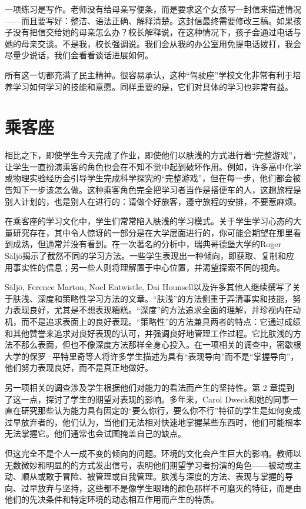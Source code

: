 一项练习是写作。老师没有给母亲写便条，而是要求这个女孩写一封信来描述情况——而且要写好：整洁、语法正确、解释清楚。这封信最终需要修改三稿。如果孩子没有把信交给她的母亲怎么办？校长解释说，在这种情况下，孩子会通过电话与她的母亲交谈。不是我，校长强调说。我们会从我的办公室用免提电话拨打，我会尽量少说话，我们会看看谈话进展如何。

所有这一切都充满了民主精神。很容易承认，这种“驾驶座”学校文化非常有利于培养学习如何学习的技能和意愿。同样重要的是，它们对具体的学习也非常有益。

\section*{乘客座}

相比之下，即使学生今天完成了作业，即使他们以肤浅的方式进行着“完整游戏”，让学生一直扮演乘客的角色也会在不知不觉中起到破坏作用。例如，许多高中化学或物理实验经历会引导学生完成科学探究的“完整游戏”，但在每一步，他们都会被告知下一步该怎么做。这种乘客角色完全把学习者当作是搭便车的人，这趟旅程是别人计划的，也是别人在进行的：请做个好旅客，遵守旅程的安排，不要惹麻烦。

在乘客座的学习文化中，学生们常常陷入肤浅的学习模式。关于学生学习心态的大量研究存在，其中令人惊讶的一部分是在大学层面进行的，你可能会期望在那里看到成熟，但通常并没有看到。在一次著名的分析中，瑞典哥德堡大学的Roger Säljö揭示了截然不同的学习方法。一些学生表现出一种倾向，即获取、复制和应用事实性的信息；另一些人则将理解置于中心位置，并渴望探索不同的视角。

Säljö, Ference Marton, Noel Entwistle, Dai Hounsell以及许多其他人继续撰写了关于肤浅、深度和策略性学习方法的文章。“肤浅”的方法侧重于弄清事实和技能，努力表现良好，尤其是不想表现糟糕。“深度”的方法追求全面的理解，并珍视内在动机，而不是追求表面上的良好表现。“策略性”的方法兼具两者的特点：它通过成绩和其他赞誉来追求对良好表现的认可，并强调良好地管理工作过程。它比肤浅的方法不那么表面，但也不像深度方法那样全身心投入。在一项相关的调查中，密歇根大学的保罗·平特里奇等人将许多学生描述为具有“表现导向”而不是“掌握导向”，他们努力表现良好，而不是真正地做好。

另一项相关的调查涉及学生根据他们对能力的看法而产生的坚持性。第 2 章提到了这一点，探讨了学生的期望对表现的影响。多年来，Carol Dweck和她的同事一直在研究那些认为能力具有固定的“要么你行，要么你不行”特征的学生是如何变成过早放弃者的，他们认为，当他们无法相对快速地掌握某些东西时，他们可能根本无法掌握它。他们通常也会试图掩盖自己的缺点。

但这完全不是个人一成不变的倾向的问题。环境的文化会产生巨大的影响。教师以无数微妙和明显的的方式发出信号，表明他们期望学习者扮演的角色——被动或主动、顺从或敢于冒险、被管理或自我管理。肤浅与深度的方法、表现与掌握的导向、过早放弃与坚持，这些都不是像学生眼睛的颜色那样不可磨灭的特征，而是由他们的先决条件和特定环境的动态相互作用而产生的特质。


